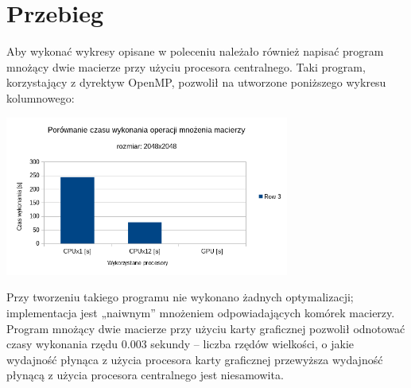 \documentclass[a4paper,12pt]{article}
\begin{document}
\section*{Przebieg}
Aby wykonać wykresy opisane w poleceniu należało również napisać program mnożący dwie macierze przy użyciu procesora centralnego.
Taki program, korzystający z dyrektyw OpenMP, pozwolił na utworzone poniższego wykresu kolumnowego: \\
\begin{center}
\includegraphics[width=0.7\textwidth]{data/wykonanie.png}
\end{center}

Przy tworzeniu takiego programu nie wykonano żadnych optymalizacji; implementacja jest „naiwnym” mnożeniem odpowiadających komórek macierzy.
\\
Program mnożący dwie macierze przy użyciu karty graficznej pozwolił odnotować czasy wykonania rzędu 0.003 sekundy – liczba rzędów wielkości, o jakie wydajność płynąca z użycia procesora karty graficznej przewyższa wydajność płynącą z użycia procesora centralnego jest niesamowita.\\
\end{document}
